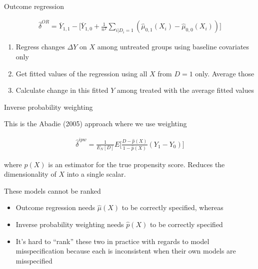 \documentclass{beamer}
\begin{document}
\begin{frame}{Outcome regression}

\begin{eqnarray*}
\widehat{\delta}^{OR} = \overline{Y}_{1,1} - \bigg [ \overline{Y}_{1,0} + \frac{1}{n^T} \sum_{i|D_i=1} ( \widehat{\mu}_{0,1}(X_i) - \widehat{\mu}_{0,0}(X_i)) \bigg ]
\end{eqnarray*}

\begin{enumerate}
\item Regress changes $\Delta Y$ on $X$ among untreated groups using baseline covariates only
\item Get fitted values of the regression using all $X$ from $D=1$ only.  Average those
\item Calculate change in this fitted $Y$ among treated with the average fitted values
\end{enumerate}

\end{frame}

\begin{frame}{Inverse probability weighting}

This is the Abadie (2005) approach where we use weighting

\begin{eqnarray*}
\widehat{\delta}^{ipw} = \frac{1}{E_N[D]} E \bigg [ \frac{D-\widehat{p}(X)}{1-\widehat{p}(X)} (Y_1-Y_0) \bigg ]
\end{eqnarray*}

where $\widehat{p}(X)$ is an estimator for the true propensity score. Reduces the dimensionality of $X$ into a single scalar.

\end{frame}

\begin{frame}{These models cannot be ranked}

\begin{itemize}
\item Outcome regression needs $\widehat{\mu}(X)$ to be correctly specified, whereas
\item Inverse probability weighting needs $\widehat{p}(X)$ to be correctly specified
\item It's hard to ``rank'' these two in practice with regards to model misspecification because each is inconsistent when their own models are misspecified
\end{itemize}

\end{frame}
\end{document}
